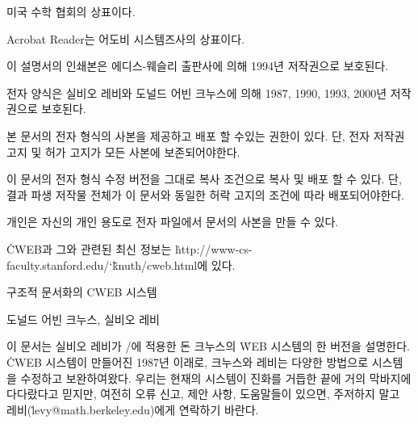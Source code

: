 \noindent
{} 미국 수학 협회의 상표이다.

\noindent
Acrobat Reader는 어도비 시스템즈사의 상표이다.

\bigskip\noindent
이 설명서의 인쇄본은 에디스-웨슬리 출판사에 의해 1994년 저작권으로 보호된다.

\smallskip\noindent
전자 양식은 실비오 레비와 도널드 어빈 크누스에 의해 1987, 1990, 1993, 2000년 저작권으로
보호된다.

\bigskip\noindent
본 문서의 전자 형식의 사본을 제공하고 배포 할 수있는 권한이 있다. 단, 전자 저작권 고지 및
허가 고지가 모든 사본에 보존되어야한다.

\smallskip\noindent
이 문서의 전자 형식 수정 버전을 그대로 복사 조건으로 복사 및 배포 할 수 있다.
단, 결과 파생 저작물 전체가 이 문서와 동일한 허락 고지의 조건에 따라 배포되어야한다.

\smallskip\noindent
개인은 자신의 개인 용도로 전자 파일에서 문서의 사본을 만들 수 있다.

\smallskip\noindent
\.{CWEB}과 그와 관련된 최신 정보는 
\.{http://www-cs-faculty.stanford.edu/\char`\~knuth/cweb.html}에 있다.

 \titletrue\eject

\titletrue
\centerline{\titlefont 구조적 문서화의 {\ttitlefont CWEB} 시스템}

\centerline{\elevenmj 도널드 어빈 크누스, 실비오 레비}

\noindent
이 문서는 실비오 레비가 \CEE/에 적용한 돈 크누스의 \.{WEB} 시스템의 한 버전을
설명한다. \.{CWEB} 시스템이 만들어진 1987년 이래로, 크누스와 레비는 다양한
방법으로 시스템을 수정하고 보완하여왔다. 우리는 현재의 시스템이 진화를 거듭한
끝에 거의 막바지에 다다랐다고 믿지만, 여전히 오류 신고, 제안 사항, 도움말들이
있으면, 주저하지 말고 레비(\.{levy@math.berkeley.edu})에게 연락하기 바란다.

